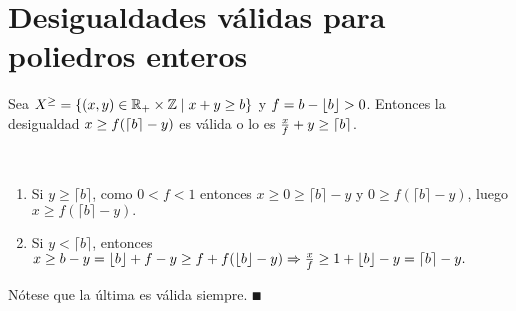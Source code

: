 \documentclass[MIOP.tex]{subfiles}
\begin{document}
\section{Desigualdades válidas para poliedros enteros}
\begin{prop}
 Sea $X^{\geq}=\{(x,y)\in\mathbb{R}_+\times \mathbb{Z} \mid x+y \geq b\}$ y $f= b-\left\lfloor{b}\right\rfloor>0$. Entonces la desigualdad $x\geq f(\left\lceil{b}\right\rceil-y)$ es válida o lo es $\frac{x}{f}+y\geq \left\lceil{b}\right\rceil$.
\end{prop}

\begin{dem}\
\begin{enumerate}
\item Si $y\geq\lceil b\rceil$, como $0<f<1$ entonces $x\geq 0\geq \lceil b\rceil-y$ y $0\geq f(\lceil b\rceil-y)$, luego $x\geq f(\lceil b\rceil-y).$
\item Si $y<\lceil b\rceil$, entonces $x\geq b-y=\lfloor b\rfloor+f-y\geq f+f(\lfloor b\rfloor-y)\Rightarrow \frac{x}{f}\geq 1+\lfloor b\rfloor-y=\left\lceil{b}\right\rceil-y.$
\end{enumerate}
Nótese que la última es válida siempre.
$\QED$
\end{dem}
\end{document}
